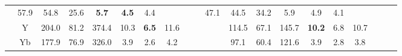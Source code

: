 \documentclass[french,10pt]{article}
\begin{document}
\begin{landscape}
\begin{longtable}{ l  c | c c c | c c c | c c c | c c c | c c c | c c c | }
                    &                     57.9
     & {\footnotesize     54.8
    } & {\footnotesize     25.6
     }
    
    
                    &                     \textbf{ 5.7}
     & {\footnotesize     \textbf{ 4.5}
    } & {\footnotesize     4.4
     }
    
    
                    & & &

                    &                     47.1
     & {\footnotesize     44.5
    } & {\footnotesize     34.2
     }
    
    
                    &                     5.9
     & {\footnotesize     4.9
    } & {\footnotesize     4.1
     }
    
    
                    & & &

                    \\*
                        & {\small Y  }

                    &                     204.0
     & {\footnotesize     81.2
    } & {\footnotesize     374.4
     }
    
    
                    &                     10.3
     & {\footnotesize     \textbf{ 6.5}
    } & {\footnotesize     11.6
     }
    
    
                    & & &

                    &                     114.5
     & {\footnotesize     67.1
    } & {\footnotesize     145.7
     }
    
    
                    &                     \textbf{ 10.2}
     & {\footnotesize     6.8
    } & {\footnotesize     10.7
     }
    
    
                    & & &

                    \\*
                        & {\small Yb  }

                    &                     177.9
     & {\footnotesize     76.9
    } & {\footnotesize     326.0
     }
    
    
                    &                     3.9
     & {\footnotesize     2.6
    } & {\footnotesize     4.2
     }
    
    
                    & & &

                    &                     97.1
     & {\footnotesize     60.4
    } & {\footnotesize     121.6
     }
    
    
                    &                     3.9
     & {\footnotesize     2.8
    } & {\footnotesize     3.8
     }
    

\end{longtable}
\end{landscape}
\end{document}
